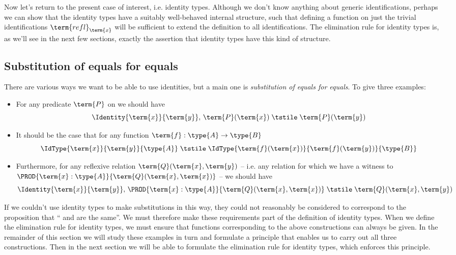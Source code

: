 Now let's return to the present case of interest, i.e. identity types.  Although we don't know anything about generic identifications, perhaps we can show that the identity types have a suitably well-behaved internal structure, such that defining a function on just the trivial identifications $\term{refl}_{\term{x}}$ will be sufficient to extend the definition to all identifications.  The elimination rule for identity types is, as we'll see in the next few sections, exactly the assertion that identity types have this kind of structure.

\newpage


\subsection{Substitution of equals for equals}

There are various ways we want to be able to use identities, but a main one is \emph{substitution of equals for equals}.  To give three examples:

\begin{itemize}

\item
For any predicate $\term{P}$ on  we should have
\[
\Identity{\term{x}}{\term{y}}, \,
\term{P}(\term{x})
	\;\tstile\;
\term{P}(\term{y})
\]

\item 
It should be the case that 
for any function $\term{f}: \type{A} \to \type{B}$
\[ 
\IdType{\term{x}}{\term{y}}{\type{A}}
	\;\tstile\;
\IdType
{\term{f}(\term{x})}
{\term{f}(\term{y})}
{\type{B}}
\]

\item
Furthermore, for any reflexive relation $\term{Q}(\term{x},\term{y})$ -- i.e. any relation for which we have a witness to
$\PROD{\term{x}:\type{A}}
{\term{Q}(\term{x},\term{x})}$ -- 
we should have
\[
\Identity{\term{x}}{\term{y}}, \,
\PROD{\term{x}:\type{A}}
{\term{Q}(\term{x},\term{x})}
	\;\tstile\;
{\term{Q}(\term{x},\term{y})}
\]
\end{itemize}
If we couldn't use identity types to make substitutions in this way, they could not reasonably be considered to correspond to the proposition that `` and  are the same''.  We must therefore make these requirements part of the definition of identity types.  
When we define the elimination rule for identity types, we must ensure that functions corresponding to the above constructions can always be given.  In the remainder of this section we will study these examples in turn and formulate a principle that enables us to carry out all three constructions.  Then in the next section we will be able to formulate the elimination rule for identity types, which enforces this principle.


